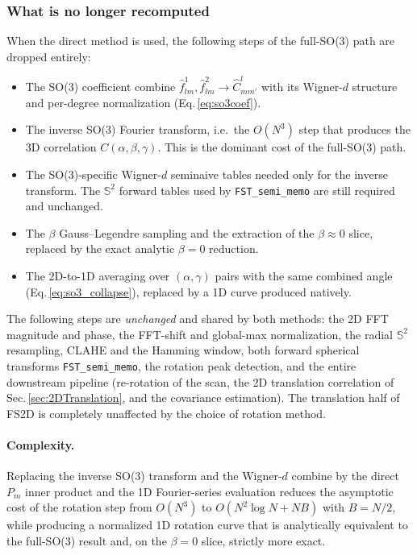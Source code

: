 \subsubsection{What is no longer recomputed}
\label{sec:direct_dropped}

When the direct method is used, the following steps of the full-SO(3) path are
dropped entirely:
\begin{itemize}
    \item The SO(3) coefficient combine
          $\hat{f}^{1}_{lm},\hat{f}^{2}_{lm}\!\to\!\hat{C}^{l}_{mm'}$ with its
          Wigner-$d$ structure and per-degree normalization
          (Eq.\,\ref{eq:so3coef}).
    \item The inverse SO(3) Fourier transform, i.e.\ the $O(N^{3})$ step that
          produces the 3D correlation $C(\alpha,\beta,\gamma)$. This is the
          dominant cost of the full-SO(3) path.
    \item The SO(3)-specific Wigner-$d$ seminaive tables needed only for the
          inverse transform. The $\mathbb{S}^{2}$ forward tables used by
          \texttt{FST\_semi\_memo} are still required and unchanged.
    \item The $\beta$ Gauss--Legendre sampling and the extraction of the
          $\beta\approx 0$ slice, replaced by the exact analytic $\beta=0$
          reduction.
    \item The 2D-to-1D averaging over $(\alpha,\gamma)$ pairs with the same
          combined angle (Eq.\,\ref{eq:so3_collapse}), replaced by a 1D curve
          produced natively.
\end{itemize}

The following steps are \emph{unchanged} and shared by both methods: the 2D FFT
magnitude and phase, the FFT-shift and global-max normalization, the radial
$\mathbb{S}^{2}$ resampling, CLAHE and the Hamming window, both forward
spherical transforms \texttt{FST\_semi\_memo}, the rotation peak detection, and
the entire downstream pipeline (re-rotation of the scan, the 2D translation
correlation of Sec.\,\ref{sec:2DTranslation}, and the covariance estimation).
The translation half of FS2D is completely unaffected by the choice of rotation
method.

\paragraph{Complexity.}
Replacing the inverse SO(3) transform and the Wigner-$d$ combine by the direct
$P_{m}$ inner product and the 1D Fourier-series evaluation reduces the
asymptotic cost of the rotation step from
$O(N^{3})$ to $O(N^{2}\log N + N B)$ with $B=N/2$, while producing a normalized
1D rotation curve that is analytically equivalent to the full-SO(3) result and,
on the $\beta=0$ slice, strictly more exact.
